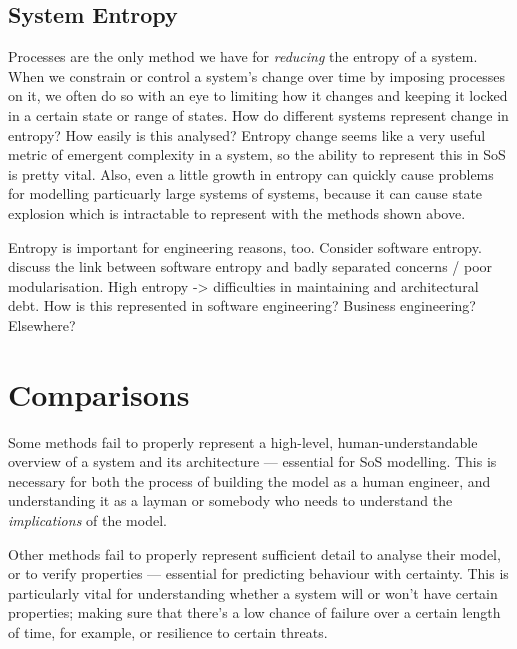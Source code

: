 \subsection{System Entropy}
Processes are the only method we have for \emph{reducing} the entropy of a system.
When we constrain or control a system's change over time by imposing processes on it, we often do so with an eye to limiting how it changes and keeping it locked in a certain state or range of states.
How do different systems represent change in entropy? How easily is this analysed?
Entropy change seems like a very useful metric of emergent complexity in a system, so the ability to represent this in SoS is pretty vital.
Also, even a little growth in entropy can quickly cause problems for modelling particuarly large systems of systems, because it can cause state explosion which is intractable to represent with the methods shown above.  
\par

Entropy is important for engineering reasons, too. Consider software entropy.
discuss the link between software entropy and badly separated concerns / poor modularisation.
High entropy -> difficulties in maintaining and architectural debt.
How is this represented in software engineering? Business engineering? Elsewhere?
\par


\section{Comparisons}

Some methods fail to properly represent a high-level, human-understandable overview of a system and its architecture --- essential for SoS modelling.
This is necessary for both the process of building the model as a human engineer, and understanding it as a layman or somebody who needs to understand the \emph{implications} of the model.
\par

Other methods fail to properly represent sufficient detail to analyse their model, or to verify properties --- essential for predicting behaviour with certainty.
This is particularly vital for understanding whether a system will or won't have certain properties; making sure that there's a low chance of failure over a certain length of time, for example, or resilience to certain threats.
\par
